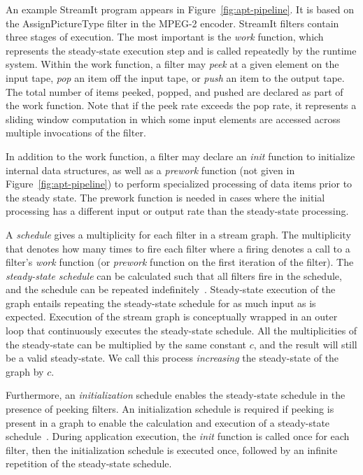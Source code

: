 An example StreamIt program appears in Figure~\ref{fig:apt-pipeline}.
It is based on the AssignPictureType filter in the MPEG-2 encoder.
StreamIt filters contain three stages of execution.  The most
important is the {\it work} function, which represents the
steady-state execution step and is called repeatedly by the runtime
system.  Within the work function, a filter may {\it peek} at a given
element on the input tape, {\it pop} an item off the input tape, or
{\it push} an item to the output tape.  The total number of items
peeked, popped, and pushed are declared as part of the work function.
Note that if the peek rate exceeds the pop rate, it represents a
sliding window computation in which some input elements are accessed
across multiple invocations of the filter.

In addition to the work function, a filter may declare an {\it init}
function to initialize internal data structures, as well as a {\it
  prework} function (not given in Figure~\ref{fig:apt-pipeline}) to
perform specialized processing of data items prior to the steady
state.  The prework function is needed in cases where the initial
processing has a different input or output rate than the steady-state
processing.

A {\it schedule} gives a multiplicity for each filter in a stream
graph.  The multiplicity that denotes how many times to fire each
filter where a firing denotes a call to a filter's {\it work} function
(or {\it prework} function on the first iteration of the filter).  The
{\it steady-state schedule} can be calculated such that all filters
fire in the schedule, and the schedule can be repeated
indefinitely~\cite{lee87}.  Steady-state execution of the graph
entails repeating the steady-state schedule for as much input as is
expected.  Execution of the stream graph is conceptually wrapped in an
outer loop that continuously executes the steady-state schedule.  All
the multiplicities of the steady-state can be multiplied by the same
constant $c$, and the result will still be a valid steady-state.  We
call this process {\it increasing} the steady-state of the graph by
$c$.

Furthermore, an {\it initialization} schedule enables the steady-state
schedule in the presence of peeking filters.  An initialization
schedule is required if peeking is present in a graph to enable the
calculation and execution of a steady-state
schedule~\cite{karczmarek-lctes03}.  During application execution, the
{\it init} function is called once for each filter, then the
initialization schedule is executed once, followed by an infinite
repetition of the steady-state schedule.

